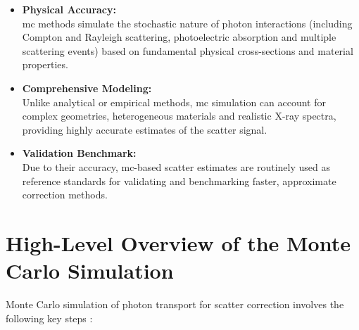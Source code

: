\begin{itemize}
    \item \textbf{Physical Accuracy:} \\
    \ac{mc} methods simulate the stochastic nature of photon interactions
    (including Compton and Rayleigh scattering, photoelectric absorption and
    multiple scattering events) based on fundamental physical cross-sections and
    material properties.

    \item \textbf{Comprehensive Modeling:} \\
    Unlike analytical or empirical methods, \ac{mc} simulation can account for
    complex geometries, heterogeneous materials and realistic X-ray spectra,
    providing highly accurate estimates of the scatter signal.

    \item \textbf{Validation Benchmark:} \\
    Due to their accuracy, \ac{mc}-based scatter estimates are routinely used as
    reference standards for validating and benchmarking faster, approximate
    correction methods.
\end{itemize}


\section{High-Level Overview of the Monte Carlo Simulation}

Monte Carlo simulation of photon transport for scatter correction involves the
following key steps \cite{mcffd2011}:


